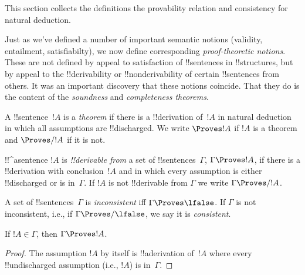 \documentclass[../../../include/open-logic-section]{subfiles}
\begin{document}
      {}
      {}


\begin{editorial}
This section collects the definitions the provability relation
and consistency for natural deduction.
\end{editorial}

\begin{explain}
Just as we've defined a number of important semantic notions
(validity, entailment, satisfiabilty), we now define corresponding
\emph{proof-theoretic notions}.  These are not defined by appeal to
satisfaction of !!{sentence}s in !!{structure}s, but by appeal to the
!!{derivability} or !!{nonderivability} of certain !!{sentence}s from
others.  It was an important discovery that these notions coincide.
That they do is the content of the \emph{soundness} and
\emph{completeness theorems}.
\end{explain}


\begin{defn}[Theorems]
A !!{sentence}~$!A$ is a \emph{theorem} if there is a !!{derivation}
of~$!A$ in natural deduction in which all assumptions are
!!{discharged}.  We write $\Proves !A$ if $!A$ is a theorem and
$\Proves/ !A$ if it is not.
\end{defn}

\begin{defn}[!!^{derivability}]
!!^a{sentence} $!A$ is \emph{!!{derivable} from} a set of
!!{sentence}s~$\Gamma$, $\Gamma \Proves !A$, if there is a
!!{derivation} with conclusion~$!A$ and in which every assumption
is either !!{discharged} or is in~$\Gamma$. If $!A$ is not
!!{derivable} from $\Gamma$ we write $\Gamma \Proves/ !A$.
\end{defn}

\begin{defn}[Consistency]
A set of !!{sentence}s~$\Gamma$ is \emph{inconsistent} iff $\Gamma
\Proves \lfalse$.  If $\Gamma$ is not inconsistent, i.e., if
$\Gamma \Proves/ \lfalse$, we say it is \emph{consistent}.
\end{defn}

\begin{prop}[Reflexivity]
If $!A \in \Gamma$, then $\Gamma \Proves !A$.
\end{prop}

\begin{proof}
The assumption $!A$ by itself is !!a{derivation} of~$!A$ where every
!!{undischarged} assumption (i.e., $!A$) is in~$\Gamma$.
\end{proof}
  
\end{document}
